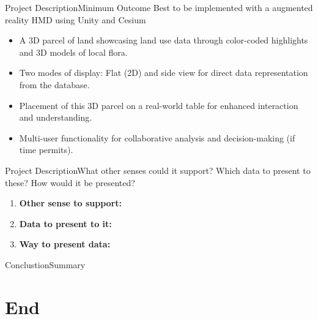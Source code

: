 \documentclass[t,aspectratio=169,divpsnames]{beamer}
\begin{document}
\begin{frame}{Project Description}{Minimum Outcome}
Best to be implemented with a augmented reality HMD using Unity and Cesium
\begin{itemize}
    \item A 3D parcel of land showcasing land use data through color-coded highlights and 3D models of local flora.
    \item Two modes of display: Flat (2D) and side view for direct data representation from the database.
    \item Placement of this 3D parcel on a real-world table for enhanced interaction and understanding.
    \item Multi-user functionality for collaborative analysis and decision-making (if time permits).
\end{itemize}

\end{frame}

\begin{frame}{Project Description}{What other senses could it support? Which data to present to these? How would it be presented?}
\scriptsize
\begin{enumerate}
    \item \textbf{Other sense to support:}
    \item \textbf{Data to present to it:}
    \item \textbf{Way to present data:}
\end{enumerate}

\end{frame}



\begin{frame}{Conclustion}{Summary}

\end{frame}
\section*{End}

\begin{frame}[allowframebreaks]{\bibname}
\end{frame}
\end{document}
